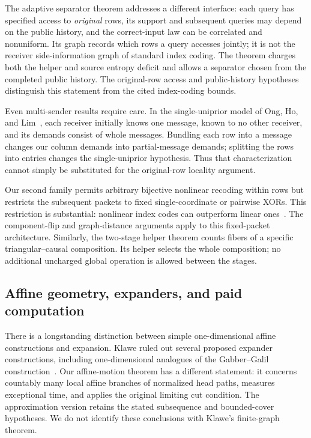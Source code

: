 The adaptive separator theorem addresses a different interface: each query
has specified access to \emph{original} rows, its support and subsequent
queries may depend on the public history, and the correct-input law can be
correlated and nonuniform. Its graph records which rows a query accesses
jointly; it is not the receiver side-information graph of standard index
coding. The theorem charges both the helper and source entropy deficit and
allows a separator chosen from the completed public history. The original-row access and public-history hypotheses distinguish this
statement from the cited index-coding bounds.

Even multi-sender results require care. In the single-uniprior model of
Ong, Ho, and Lim~\cite{OngHoLim2016}, each receiver initially knows one
message, known to no other receiver, and its demands consist of whole
messages. Bundling each row into a message changes our column demands into
partial-message demands; splitting the rows into entries changes the
single-uniprior hypothesis. Thus that characterization cannot simply be
substituted for the original-row locality argument.

Our second family permits arbitrary bijective nonlinear recoding within
rows but restricts the subsequent packets to fixed single-coordinate or
pairwise XORs. This restriction is substantial: nonlinear index codes can
outperform linear ones~\cite{LubetzkyStav2008}. The component-flip and graph-distance arguments apply to this fixed-packet
architecture. Similarly, the two-stage helper theorem counts fibers of a specific
triangular--causal composition. Its helper selects the whole composition; no additional uncharged
global operation is allowed between the stages.

\subsection{Affine geometry, expanders, and paid computation}

There is a longstanding distinction between simple one-dimensional affine
constructions and expansion. Klawe ruled out several proposed expander
constructions, including one-dimensional analogues of the Gabber--Galil
construction~\cite{Klawe1984}. Our affine-motion theorem has a different
statement: it concerns countably many local affine branches of normalized
head paths, measures exceptional time, and applies the original limiting
cut condition. The approximation version retains the stated subsequence
and bounded-cover hypotheses. We do not identify these conclusions with
Klawe's finite-graph theorem.

